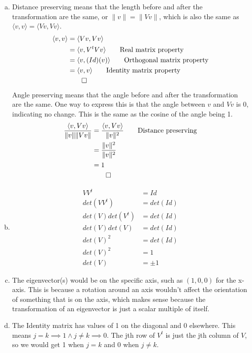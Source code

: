 \documentclass[12pt]{article}
\begin{document}
\section{} %
\begin{enumerate}[(a)]
	\item 
		Distance preserving means that the length before and after the transformation are the same, or $ \|v\| = \|Vv\|$, which is also the same as $ \langle v, v\rangle = \langle Vv, Vv\rangle $.
		\begin{align*}
			\langle v, v\rangle &= \langle Vv, Vv\rangle\\
			&= \langle v, V^tVv \rangle \tag*{Real matrix property}\\
			&= \langle v, (Id)(v)\rangle \tag*{Orthogonal matrix property}\\
			&= \langle v, v\rangle \tag*{Identity matrix property}\\
			&\qed
		\end{align*}
		Angle preserving means that the angle before and after the transformation are the same. One way to express this is that the angle between $ v $ and $ Vv $ is 0, indicating no change. This is the same as the cosine of the angle being 1.
		\begin{align*}
			\dfrac{\langle v, Vv\rangle}{\|v\|\|Vv\|} &= \dfrac{\langle v, Vv\rangle}{\|v\|^2} \tag*{Distance preserving}\\
			&= \dfrac{\|v\|^2}{\|v\|^2}\\
			&= 1\\
			&\qed
		\end{align*}
	\item 
		\begin{align*}
			VV^t &= Id\\
			det(VV^t) &= det(Id)\\
			det(V)det(V^t) &= det(Id) \tag*{$ det(XY) = det(X) det(Y) $}\\
			det(V)det(V) &= det(Id) \tag*{$ det(X^t) = det(X) $}\\
			det(V)^2 &= det(Id) \tag*{$ det(Id) = 1 $}\\
			det(V)^2 &= 1\\
			det(V) &= \pm 1
		\end{align*}
	
	\item The eigenvector(s) would be on the specific axis, such as $ (1,0,0) $ for the x-axis. This is because a rotation around an axis wouldn't affect the orientation of something that is on the axis, which makes sense because the transformation of an eigenvector is just a scalar multiple of itself.
	
	\item The Identity matrix has values of 1 on the diagonal and 0 elsewhere. This means $ j=k \implies 1 \land j\neq k \implies 0 $. The jth row of $ V^t $ is just the jth column of $ V $, so we would get 1 when $ j=k $ and 0 when $ j\neq k $.
\end{enumerate}
\newpage
\end{document}
